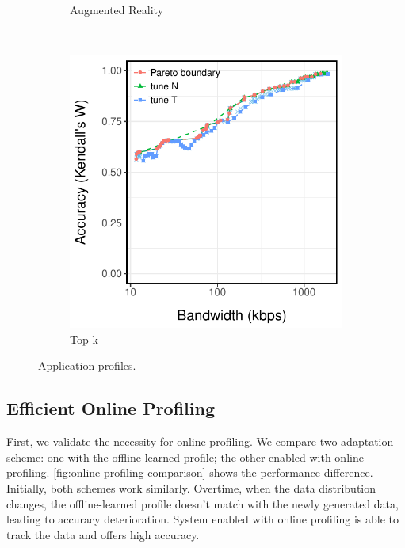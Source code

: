 \begin{figure}
\begin{subfigure}[t]{0.33\textwidth}
    \caption{Augmented Reality}
    \label{fig:ar-profile}
  \end{subfigure}
  ~
  \begin{subfigure}[t]{0.33\textwidth}
    \centering
    \includegraphics[width=\textwidth]{figures/topk-profile.pdf}
    \caption{Top-k}
    \label{fig:tk-profile}
  \end{subfigure}
  \caption{Application profiles.}
  \label{fig:all-profiles}
\end{figure}

\subsection{Efficient Online Profiling}
\label{sec:online-profiling}

First, we validate the necessity for online profiling. We compare two adaptation
scheme: one with the offline learned profile; the other enabled with online
profiling. \autoref{fig:online-profiling-comparison} shows the performance
difference. Initially, both schemes work similarly. Overtime, when the data
distribution changes, the offline-learned profile doesn't match with the newly
generated data, leading to accuracy deterioration. System enabled with online
profiling is able to track the data and offers high accuracy.


